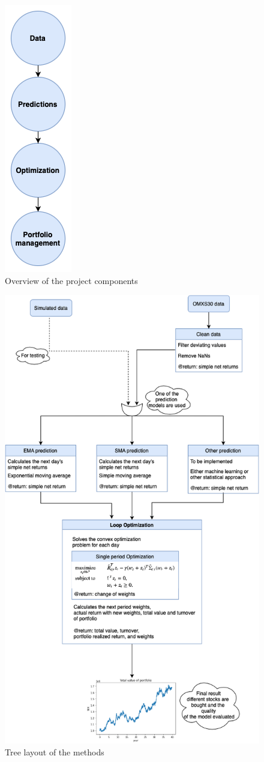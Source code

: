 \documentclass{LTHtwocol} %
\begin{document}
\begin{figure}[h]
	\centering
	\includegraphics[width=0.2\columnwidth]{Pics/Overview_tree.png}
	\caption{Overview of the project components}
	\label{fig:overview} %
\end{figure}

\begin{figure}[h]
	\centering
	\includegraphics[width=0.7\columnwidth]{Pics/Mod_overview_atm.png}
	\caption{Tree layout of the methods}
	\label{fig:tree_atm} %
\end{figure}
\end{document}
